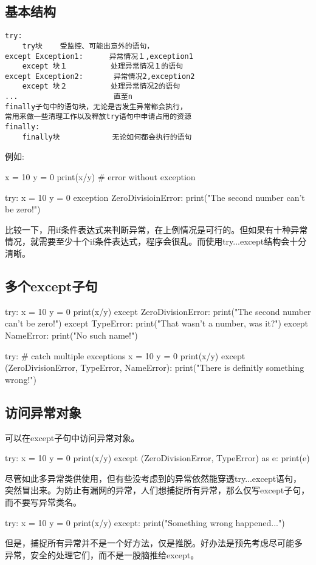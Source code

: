 \subsection{基本结构}
\begin{framed}
\begin{verbatim}
try:
    try块    受监控、可能出意外的语句，
except Exception1:　　　 异常情况１,exception1
    except 块１          处理异常情况１的语句
except Exception2:       异常情况2,exception2
    except 块２          处理异常情况2的语句
...                      直至n
finally子句中的语句块，无论是否发生异常都会执行，
常用来做一些清理工作以及释放try语句中申请占用的资源
finally:
    finally块            无论如何都会执行的语句
\end{verbatim}
\end{framed}
例如:
\begin{python}
x  = 10
y = 0
print(x/y) # error without exception

try:
    x = 10
    y = 0
exception ZeroDivisioinError:
    print("The second number can't be zero!")
\end{python}
比较一下，用if条件表达式来判断异常，在上例情况是可行的。但如果有十种异常情况，就需要至少十个if条件表达式，程序会很乱。而使用try...except结构会十分清晰。
\subsection{多个except子句}
\begin{python}
try:
    x = 10
    y = 0
    print(x/y)
except ZeroDivisionError:
    print("The second number can't be zero!")
except TypeError:
    print("That wasn't a number, was it?")
except NameError:
    print("No such name!")

try:  # catch multiple exceptions
    x = 10
    y = 0
    print(x/y)
except (ZeroDivisionError, TypeError, NameError):
    print("There is definitly something wrong!")
\end{python}

\subsection{访问异常对象}
可以在except子句中访问异常对象。
\begin{python}
try:
    x = 10
    y = 0
    print(x/y)
except (ZeroDivisionError, TypeError) as e:
    print(e)
\end{python}

尽管如此多异常类供使用，但有些没考虑到的异常依然能穿透try...except语句，
突然冒出来。为防止有漏网的异常，人们想捕捉所有异常，那么仅写except子句，
而不要写异常类名。
\begin{python}
try:
    x = 10
    y = 0
    print(x/y)
except:
    print("Something wrong happened...")
\end{python}
但是，捕捉所有异常并不是一个好方法，仅是推脱。好办法是预先考虑尽可能多
异常，安全的处理它们，而不是一股脑推给except。
